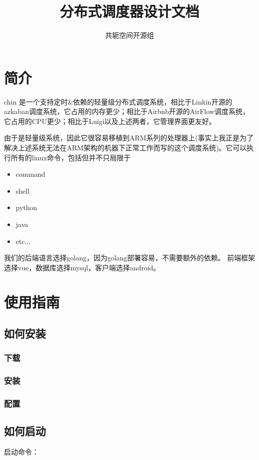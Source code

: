 ﻿\documentclass[a4paper]{report}
\title{分布式调度器设计文档}
\author{共轭空间开源组}
\begin{document}
\maketitle
\tableofcontents
\chapter{简介} %
\label{sec:简介}
chin 是一个支持定时\&依赖的轻量级分布式调度系统，相比于Linkin开源的azkaban调度系统，它占用的内存更少；相比于Airbnb开源的AirFlow调度系统，它占用的CPU更少；相比于Luigi以及上述两者，它管理界面更友好。

由于是轻量级系统，因此它很容易移植到ARM系列的处理器上(事实上我正是为了解决上述系统无法在ARM架构的机器下正常工作而写的这个调度系统)。它可以执行所有的linux命令，包括但并不只局限于
\begin{itemize}
	\item command
	\item shell
	\item python
	\item java
	\item etc...
\end{itemize}

我们的后端语言选择golang，因为golang部署容易，不需要额外的依赖。 前端框架选择vue，数据库选择mysql，客户端选择android。






\chapter{使用指南} %

\section{如何安装} %
\subsection{下载} %
\subsection{安装} %
\subsection{配置} %


\section{如何启动} %
启动命令： 
\end{document}
